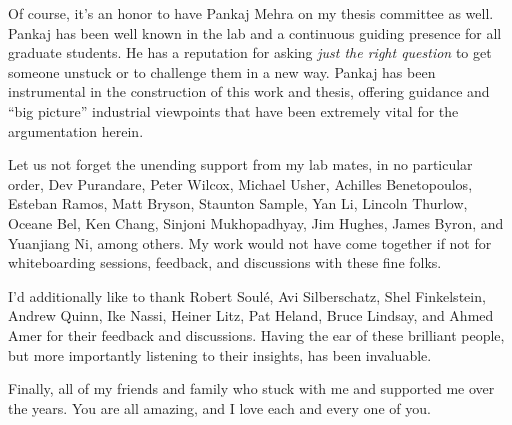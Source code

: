 Of course, it's an honor to have Pankaj Mehra on my thesis committee as well. Pankaj has been well known in the lab and
a continuous guiding presence for all graduate students. He has a reputation for asking \emph{just the right question}
to get someone unstuck or to challenge them in a new way. Pankaj has been instrumental in the construction of this work
and thesis, offering guidance and ``big picture'' industrial viewpoints that have been extremely vital for the
argumentation herein.

Let us not forget the unending support from my lab mates, in no particular order, Dev Purandare, Peter Wilcox, Michael Usher,
Achilles Benetopoulos, Esteban Ramos, Matt Bryson, Staunton Sample, Yan Li, Lincoln Thurlow, Oceane Bel, Ken Chang,
Sinjoni Mukhopadhyay, Jim Hughes, James Byron, and Yuanjiang Ni, among others. My work would not have come together if not for whiteboarding
sessions, feedback, and discussions with these fine folks.

I'd additionally like to thank Robert Soulé, Avi Silberschatz, Shel Finkelstein, Andrew Quinn, Ike Nassi, Heiner Litz,
Pat Heland, Bruce Lindsay, and Ahmed Amer for their feedback and discussions. Having the ear of these brilliant people,
but more importantly listening to their insights, has been invaluable.

Finally, all of my friends and family who stuck with me and supported me over the years. You are all amazing, and I love each and
every one of you.



\endgroup

